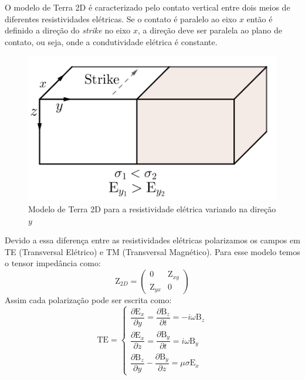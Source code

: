         O modelo de Terra 2D é caracterizado pelo contato vertical entre dois meios de diferentes resistividades elétricas. Se o contato é
	    paralelo ao eixo $x$ então é definido a direção do \textit{strike} no eixo $x$, a direção deve ser paralela ao plano de contato,
	    ou seja, onde a condutividade elétrica é constante.
	    
	    \begin{figure}[H]
	        \caption{Modelo de Terra 2D para a resistividade elétrica variando na direção $y$}
	        \begin{center}
	        \includegraphics[width=12cm]{texto/fig/Tm_Te.png} 
	        \end{center}
		\label{fig_strike}
	    \end{figure}
	    Devido a essa diferença entre as resistividades elétricas polarizamos os campos em TE (Transversal Elétrico) e TM (Transversal Magnético).
	    Para esse modelo temos o tensor impedância como:
	    \begin{equation}
	     \textrm{Z}_{2D} = \left (\begin{array}{cc}
	                               0 & \textrm{Z}_{xy} \\
	                               \textrm{Z}_{yx} & 0
	                              \end{array} \right)
	    \end{equation}
	    Assim cada polarização pode ser escrita como:
	    \begin{equation}
	     \textrm{TE} = \left \{ \begin{array}{l}
	            \dfrac{\partial \textrm{E}_x}{\partial y} = \dfrac{\partial \textrm{B}_z}{\partial t} = -i\omega \textrm{B}_z \\[10pt]
	           \dfrac{\partial \textrm{E}_x}{\partial z} = \dfrac{\partial \textrm{B}_y}{\partial t} = i\omega \textrm{B}_y \\[10pt]
	           \dfrac{\partial \textrm{B}_z}{\partial y} - \dfrac{\partial \textrm{B}_y}{\partial z} = \mu \sigma \textrm{E}_x 
	           \end{array} \right.
	    \end{equation}

